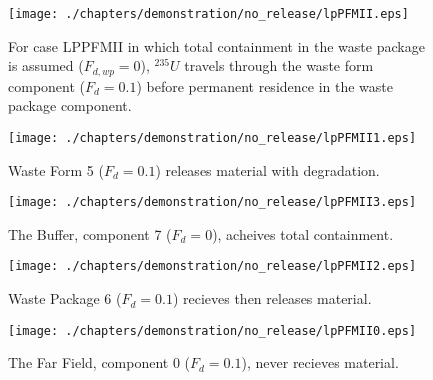 \begin{figure}[ht]
\centering
\texttt{[image: ./chapters/demonstration/no\_release/lpPFMII.eps]}
\caption[$^{235}U$ residence. Lumped Parameter PFM Waste Package No Release.]{
For case LPPFMII in which total containment in the waste package is assumed 
($F_{d,wp}=0$), $^{235}U$ travels through the waste form component ($F_d = 0.1$) before 
permanent residence in the waste package component.
}
\label{fig:lpPFMIIall}
\begin{minipage}[b]{0.45\linewidth}

  \texttt{[image: ./chapters/demonstration/no\_release/lpPFMII1.eps]}
  \caption[LPPFMII Waste Form Contaminants.]{
    Waste Form 5 ($F_d = 0.1$) releases material with degradation. 
    }
  \label{fig:lpPFMIIwf5}
  
  \texttt{[image: ./chapters/demonstration/no\_release/lpPFMII3.eps]}
  \caption[Case LPPFMII Buffer Contaminants]{
    The Buffer, component 7 ($F_d=0$), acheives total containment.
    }
  \label{fig:lpPFMIIbuff}

\end{minipage}
\hspace{0.05\linewidth}
\begin{minipage}[b]{0.45\linewidth}
  \texttt{[image: ./chapters/demonstration/no\_release/lpPFMII2.eps]}
  \caption[Case LPPFMII Waste Package Contaminants.]{ 
    Waste Package 6 ($F_d = 0.1$) recieves then releases material. 
    }
  \label{fig:lpPFMIIwp6}

  \texttt{[image: ./chapters/demonstration/no\_release/lpPFMII0.eps]}
  \caption[Case LPPFMII Waste Package Contaminants.]{ 
    The Far Field, component 0 ($F_d = 0.1$), never recieves material.
    }
  \label{fig:lpPFMIIff0}


  \end{minipage}
\end{figure}
%
